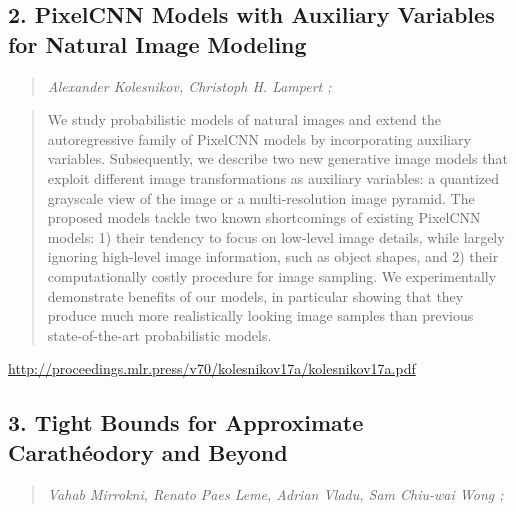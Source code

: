 \documentclass{article}
\begin{document}
\subsection{2. PixelCNN Models with Auxiliary Variables for Natural Image Modeling}

\begin{quote}
\footnotesize{\textit{Alexander Kolesnikov, Christoph H. Lampert ;}}

\end{quote}

\begin{quote}
    We study probabilistic models of natural images and extend the autoregressive family of PixelCNN models by incorporating auxiliary variables. Subsequently, we describe two new generative image models that exploit different image transformations as auxiliary variables: a quantized grayscale view of the image or a multi-resolution image pyramid. The proposed models tackle two known shortcomings of existing PixelCNN models: 1) their tendency to focus on low-level image details, while largely ignoring high-level image information, such as object shapes, and 2) their computationally costly procedure for image sampling. We experimentally demonstrate benefits of our models, in particular showing that they produce much more realistically looking image samples than previous state-of-the-art probabilistic models.  
\end{quote}

\href{http://proceedings.mlr.press/v70/kolesnikov17a/kolesnikov17a.pdf}{http://proceedings.mlr.press/v70/kolesnikov17a/kolesnikov17a.pdf}

\subsection{3. Tight Bounds for Approximate Carathéodory and Beyond}

\begin{quote}
\footnotesize{\textit{Vahab Mirrokni, Renato Paes Leme, Adrian Vladu, Sam Chiu-wai Wong ;}}

\end{quote}
\end{document}
